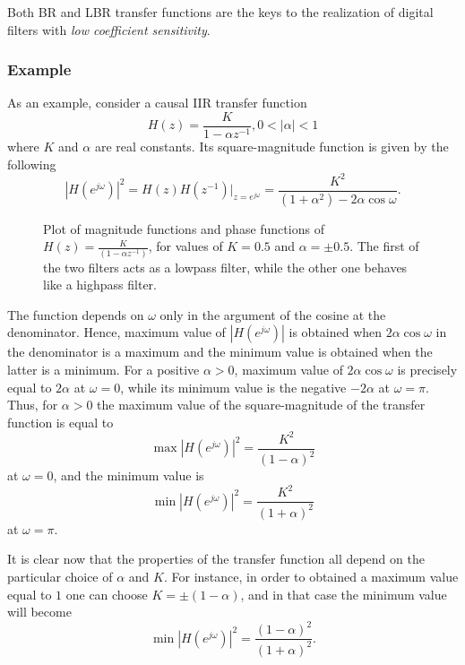 \documentclass[\documentfontsize, twocolumn]{\classname}
\begin{document}
Both BR and LBR transfer functions are the keys to the realization of digital filters with \emph{low coefficient sensitivity}.

\subsubsection{Example}
As an example, consider a causal IIR transfer function
\[
    H(z) = \frac{
        K
    } {
        1 - \alpha z^{-1}
    },
    0 < |\alpha| < 1
\]
where $K$ and $\alpha$ are real constants. Its square-magnitude function is given by the following
\[
    \left|H(e^{j\omega})\right|^2 = H(z)H(z^{-1})\Bigr\rvert_{z=e^{j\omega}} =
        \frac {
            K^2
        } { 
            (1 + \alpha^2) - 2\alpha\cos{\omega}
        }.
\]


\begin{figure*}[ht]
\begin{center}
\scalebox{0.6}{
    
}\caption{Plot of magnitude functions and phase functions of $H(z) = \frac{K}{(1 - \alpha z^{-1})}$, for values of $K=0.5$ and $\alpha=\pm 0.5$. The first of the two filters acts as a lowpass filter, while the other one behaves like a highpass filter.}\label{oct:boundedRealTransferFunctionsExample}
\end{center}
\end{figure*}

The function depends on $\omega$ only in the argument of the cosine at the denominator. Hence, maximum value of $\left|H(e^{j\omega})\right|$ is obtained when $2\alpha \cos{\omega}$ in the denominator is a maximum and the minimum value is obtained when the latter is a minimum. For a positive $\alpha > 0$, maximum value of $2\alpha\cos{\omega}$ is precisely equal to $2\alpha$ at $\omega=0$, while its minimum value is the negative $-2\alpha$ at $\omega=\pi$.
Thus, for $\alpha > 0$ the maximum value of the square-magnitude of the transfer function is equal to
\[
    \max{\left|H(e^{j\omega})\right|^2} = \frac {
        K^2
    } {
        (1 - \alpha)^2
    }
\]
at $\omega=0$, and the minimum value is 
\[
    \min{\left|H(e^{j\omega})\right|^2} = \frac {
        K^2
    } {
        (1 + \alpha)^2
    }
\]
at $\omega=\pi$.

It is clear now that the properties of the transfer function all depend on the particular choice of $\alpha$ and $K$. For instance, in order to obtained a maximum value equal to $1$ one can choose $K = \pm(1 - \alpha)$, and in that case the minimum value will become
\[
    \min{\left|H(e^{j\omega})\right|^2} = \frac {
        (1 - \alpha)^2
    } {
        (1 + \alpha)^2
    }.
\]
\end{document}
